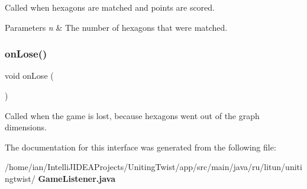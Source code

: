 Called when hexagons are matched and points are scored. 


\begin{DoxyParams}{Parameters}
{\em n} & The number of hexagons that were matched. \\
\hline
\end{DoxyParams}
\mbox{\label{interfaceunitingtwist_1_1_game_listener_ad3a588cbd6aa6344ad9a032223571669}} 
\subsubsection{on\+Lose()}
{\footnotesize\ttfamily void on\+Lose (\begin{DoxyParamCaption}{ }\end{DoxyParamCaption})}



Called when the game is lost, because hexagons went out of the graph dimensions. 



The documentation for this interface was generated from the following file\+:\begin{DoxyCompactItemize}
\item 
/home/ian/\+Intelli\+J\+I\+D\+E\+A\+Projects/\+Uniting\+Twist/app/src/main/java/ru/litun/unitingtwist/\textbf{ Game\+Listener.\+java}\end{DoxyCompactItemize}
